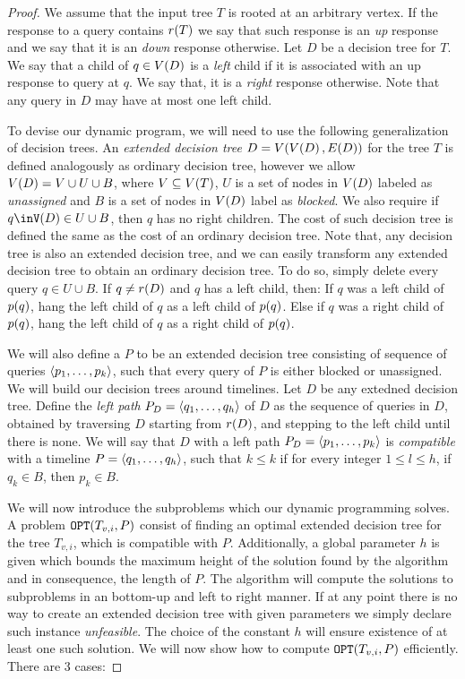 \begin{theorem}
\begin{proof}
We assume that the input tree $T$ is rooted at an arbitrary vertex. If the response to a query contains $r\mathopen{}\left( T \right)$ we say that such response is an \textit{up} response and we say that it is an \textit{down} response otherwise. Let $D$ be a decision tree for $T$. We say that a child of $q\in V\mathopen{}\left( D \right)$ is a \textit{left} child if it is associated with an up response to query at $q$. We say that, it is a \textit{right} response otherwise. Note that any query in $D$ may have at most one left child.

To devise our dynamic program, we will need to use the following generalization of decision trees. An \textit{extended decision tree} $D=V\mathopen{}\left( V\mathopen{}\left( D \right), E\mathopen{}\left( D \right) \right)$ for the tree $T$ is defined analogously as ordinary decision tree, however we allow $V\mathopen{}\left( D \right)=V\cup U \cup B$, where $V\subseteq V\mathopen{}\left( T \right)$, $U$ is a set of nodes in $V\mathopen{}\left( D \right)$ labeled as \textit{unassigned} and $B$ is a set of nodes in $V\mathopen{}\left( D \right)$ label as \textit{blocked}. We also require if $q\inV\br{D}\in U\cup B$, then $q$ has no right children. The cost of such decision tree is defined the same as the cost of an ordinary decision tree. Note that, any decision tree is also an extended decision tree, and we can easily transform any extended decision tree to obtain an ordinary decision tree. To do so, simply delete every query $q\in U\cup B$. If $q\neq r\mathopen{}\left( D \right)$ and $q$ has a left child, then: If $q$ was a left child of $p\mathopen{}\left( q \right)$, hang the left child of $q$ as a left child of $p\mathopen{}\left( q \right)$. Else if $q$ was a right child of $p\mathopen{}\left( q \right)$, hang the left child of $q$ as a right child of $p\mathopen{}\left( q \right)$.

We will also define a  $P$ to be an extended decision tree consisting of sequence of queries $\mathopen{}\langle p_1,\dots,p_k \rangle$, such that every query of $P$ is either blocked or unassigned. We will build our decision trees around timelines. Let $D$ be any extedned decision tree. Define the \textit{left path} $P_D=\mathopen{}\langle q_1,\dots,q_h \rangle$ of $D$ as the sequence of queries in $D$, obtained by traversing $D$ starting from $r\mathopen{}\left( D \right)$, and stepping to the left child until there is none. We will say that $D$ with a left path $P_D=\mathopen{}\langle p_1,\dots,p_k \rangle$ is \textit{compatible} with a timeline $P=\mathopen{}\langle q_1,\dots,q_h \rangle$, such that $k\leq k$ if for every integer $1\leq l \leq h$, if $q_k\in B$, then $p_k\in B$. 

We will now introduce the subproblems which our dynamic programming solves. A problem $\texttt{OPT}\mathopen{}\left( T_{v,i}, P \right)$ consist of finding an optimal extended decision tree for the tree $T_{v,i}$, which is compatible with $P$. Additionally, a global parameter $h$ is given which bounds the maximum height of the solution found by the algorithm and in consequence, the length of $P$. The algorithm will compute the solutions to subproblems in an bottom-up and left to right manner. If at any point there is no way to create an extended decision tree with given parameters we simply declare such instance \textit{unfeasible}. The choice of the constant $h$ will ensure existence of at least one such solution. We will now show how to compute $\texttt{OPT}\mathopen{}\left( T_{v,i}, P \right)$ efficiently. There are 3 cases:


\end{proof}
\end{theorem}
